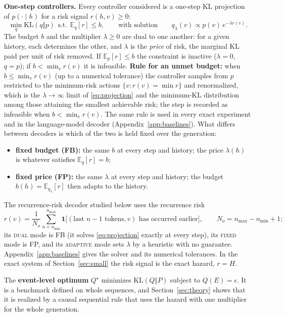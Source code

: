 \documentclass[make,article,submit,pdftex]{Definitions/mdpi}
\providecommand{\KL}{}\renewcommand{\KL}{\mathrm{KL}}
\providecommand{\E}{}\renewcommand{\E}{\mathbb{E}}
\begin{document}
\textbf{One-step controllers.} Every controller considered is a one-step KL projection of $p(\cdot\mid h)$ for a risk signal $r(h,v)\ge 0$:
\begin{equation}\label{eq:projection}
\min_q \KL(q\Vert p)\ \ \text{s.t.}\ \ \E_q[r]\le b,\qquad\text{with solution}\qquad q_\lambda(v)\propto p(v)\,e^{-\lambda r(v)} .
\end{equation}
The budget $b$ and the multiplier $\lambda\ge 0$ are dual to one another: for a given history, each determines the other, and $\lambda$ is the \emph{price} of risk, the marginal KL paid per unit of risk removed. If $\E_p[r]\le b$ the constraint is inactive ($\lambda=0$, $q=p$); if $b<\min_v r(v)$ it is infeasible. \textbf{Rule for an unmet budget:} when $b\le\min_vr(v)$ (up to a numerical tolerance) the controller samples from $p$ restricted to the minimum-risk actions $\{v:r(v)=\min r\}$ and renormalized, which is the $\lambda\to\infty$ limit of \eqref{eq:projection} and the minimum-KL distribution among those attaining the smallest achievable risk; the step is recorded as infeasible when $b<\min_vr(v)$. The same rule is used in every exact experiment and in the language-model decoder (Appendix~\ref{app:baselines}). What differs between decoders is which of the two is held fixed over the generation:
\begin{itemize}[leftmargin=*,itemsep=1pt]
\item \textbf{fixed budget (FB):} the same $b$ at every step and history; the price $\lambda(h)$ is whatever satisfies $\E_q[r]=b$;
\item \textbf{fixed price (FP):} the same $\lambda$ at every step and history; the budget $b(h)=\E_{q_\lambda}[r]$ then adapts to the history.
\end{itemize}
The recurrence-risk decoder studied below uses the recurrence risk
\[
r(v)=\frac1{N_o}\sum_{n=n_{\min}}^{n_{\max}}\mathbf{1}\big[(\text{last }n{-}1\text{ tokens},v)\text{ has occurred earlier}\big],\qquad N_o=n_{\max}-n_{\min}+1;
\]
its \textsc{dual} mode is FB (it solves \eqref{eq:projection} exactly at every step), its \textsc{fixed} mode is FP, and its \textsc{adaptive} mode sets $\lambda$ by a heuristic with no guarantee. Appendix~\ref{app:baselines} gives the solver and its numerical tolerances. In the exact system of Section~\ref{sec:small} the risk signal is the exact hazard, $r=H$.

The \textbf{event-level optimum} $Q^\star$ minimizes $\KL(Q\Vert P)$ subject to $Q(E)=\epsilon$. It is a benchmark defined on whole sequences, and Section~\ref{sec:theory} shows that it is realized by a causal sequential rule that uses the hazard with one multiplier for the whole generation.
\end{document}

